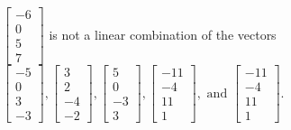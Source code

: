 \begin{exercise}
\begin{exerciseStatement}
  \end{exerciseStatement}
  \begin{exerciseAnswer}
   \(\left[\begin{array}{c}
-6 \\
0 \\
5 \\
7
\end{array}\right]\) 
  	 is not  
	a linear combination of the vectors \(\left[\begin{array}{c}
-5 \\
0 \\
3 \\
-3
\end{array}\right] , \left[\begin{array}{c}
3 \\
2 \\
-4 \\
-2
\end{array}\right] , \left[\begin{array}{c}
5 \\
0 \\
-3 \\
3
\end{array}\right] , \left[\begin{array}{c}
-11 \\
-4 \\
11 \\
1
\end{array}\right] , \text{ and } \left[\begin{array}{c}
-11 \\
-4 \\
11 \\
1
\end{array}\right]\).

	
  


  \end{exerciseAnswer}
\end{exercise}